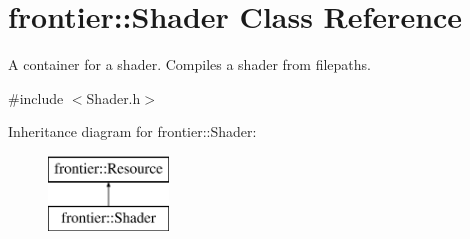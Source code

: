 \hypertarget{classfrontier_1_1_shader}{}\section{frontier\+:\+:Shader Class Reference}
\label{classfrontier_1_1_shader}


A container for a shader. Compiles a shader from filepaths.  




{\ttfamily \#include $<$Shader.\+h$>$}

Inheritance diagram for frontier\+:\+:Shader\+:\begin{figure}[H]
\begin{center}
\leavevmode
\includegraphics[height=2.000000cm]{classfrontier_1_1_shader}
\end{center}
\end{figure}
